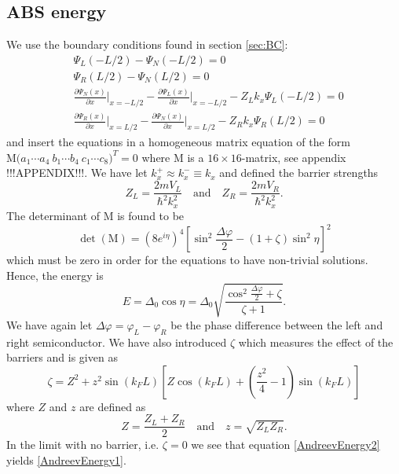 \subsection{ABS energy}
We use the boundary conditions found in section \ref{sec:BC}:
\begin{equation}
\begin{split}
    &\Psi_L(-L/2) - \Psi_N(-L/2) = 0\\
    &\Psi_R(L/2) - \Psi_N(L/2) = 0\\
    &\frac{\partial \Psi_N(x)}{\partial x}\bigg|_{x = -L/2} - \frac{\partial \Psi_L(x)}{\partial x}\bigg|_{x = -L/2} - Z_L k_x\Psi_L(-L/2) = 0\\
    &\frac{\partial \Psi_R(x)}{\partial x}\bigg|_{x = L/2} - \frac{\partial \Psi_N(x)}{\partial x}\bigg|_{x = L/2} - Z_R k_x\Psi_R(L/2) = 0
\end{split}
\end{equation}
and insert the equations in a homogeneous matrix equation of the form $\mathrm{M} \big(a_1 \cdots a_4 \ b_1 \cdots b_4 \ c_1 \cdots c_8\big)^T = 0$ where $\mathrm{M}$ is a $16 \times 16$-matrix, see appendix !!!APPENDIX!!!. We have let $k_x^+ \approx k_x^- \equiv k_x$ and defined the barrier strengths
\begin{equation}
    Z_L = \frac{2mV_L}{\hbar^2 k_x^2}
    \quad \mathrm{and} \quad
    Z_R = \frac{2mV_R}{\hbar^2 k_x^2}.
\end{equation}
The determinant of M is found to be
\begin{equation}
    \det(\mathrm{M}) = \left(8e^{i\eta}\right)^4\left[\sin^2\frac{\Delta\varphi}{2}-(1+\zeta)\sin^2\eta\right]^2
\end{equation}
which must be zero in order for the equations to have non-trivial solutions. Hence, the energy is
\begin{equation}
    E=\Delta_0\cos\eta = \Delta_0\sqrt{\frac{\cos^2 \frac{\Delta\varphi}{2} + \zeta}{\zeta + 1}}.
    \label{AndreevEnergy2}
\end{equation}
We have again let $\Delta\varphi = \varphi_L-\varphi_R$ be the phase difference between the left and right semiconductor. We have also introduced $\zeta$ which measures the effect of the barriers and is given as
\begin{equation}
    \zeta = Z^2 + z^2\sin(k_FL)\left[Z\cos(k_FL)+\left(\frac{z^2}{4}-1\right)\sin(k_FL)\right]
\end{equation}
where $Z$ and $z$ are defined as 
\begin{equation}
    Z=\frac{Z_L + Z_R}{2}
    \quad \mathrm{and} \quad
    z = \sqrt{Z_LZ_R}.
\end{equation}
In the limit with no barrier, i.e. $\zeta = 0$ we see that equation \eqref{AndreevEnergy2} yields \eqref{AndreevEnergy1}.

